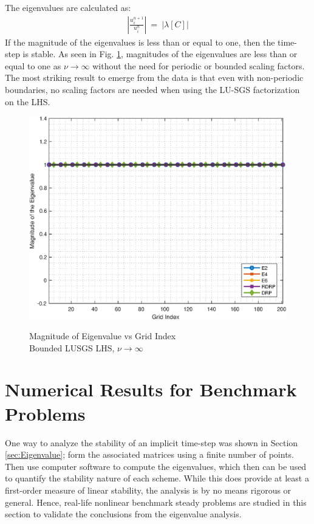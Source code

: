 \documentclass[conf]{new-aiaa}
\begin{document}
The eigenvalues are calculated as:
\begin{equation}
	\begin{split}
		\label{eq:Magnitude_Of_Eigen}
  			\left|\frac{u_i^{n+1}}{u_i^{n}}\right|~=~\left|\lambda\left[C\right]\right|
	\end{split}
\end{equation}
If the magnitude of the eigenvalues is less than or equal to one, then the time-step is stable.  
As seen in Fig. \ref{fig:LUSGS_index_vs_mag_Scaling_Bounded}, magnitudes of the eigenvalues are less than or equal to one as $\nu\to\infty$ without the need for periodic or bounded scaling factors. 
The most striking result to emerge from the data is that even with non-periodic boundaries, no scaling factors are needed when using the LU-SGS factorization on the LHS. 



\begin{figure}[hbtp!]
	\centering
	{\includegraphics[width=.7\textwidth]{Figures/LUSGS_index_vs_mag_ScaleFactor_Periodic}}
	\caption{Magnitude of Eigenvalue vs Grid Index \\
	Bounded LUSGS LHS, $\nu\to\infty$}
	\label{fig:LUSGS_index_vs_mag_Scaling_Bounded}
\end{figure}

\section{Numerical Results for Benchmark
Problems}
One way to analyze the stability of an implicit time-step was shown in Section \ref{sec:Eigenvalue}; 
form the associated matrices using a finite number of points. Then use computer software to compute the eigenvalues, which then can be used to quantify the stability nature of each scheme. 
While this does provide at least a first-order measure of linear stability, the analysis is by no means rigorous or general. 
Hence, real-life nonlinear benchmark steady problems are studied in this section to validate the conclusions from the eigenvalue analysis. 
\end{document}
